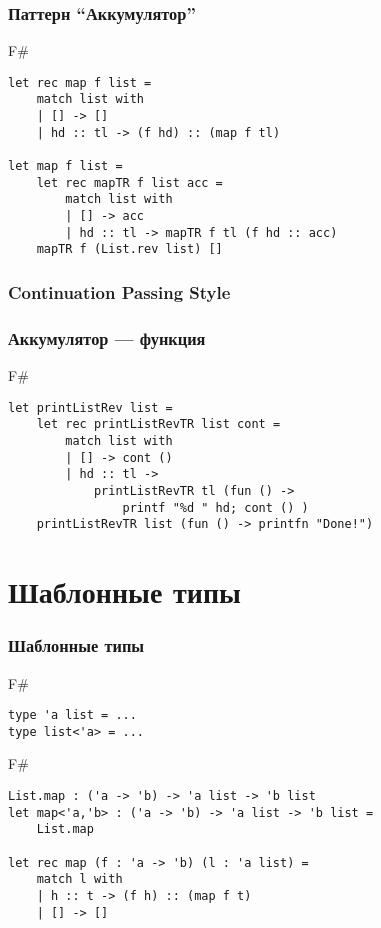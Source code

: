 \documentclass[xetex,mathserif,serif]{beamer}
\begin{document}
\begin{frame}[fragile]
	\frametitle{Паттерн ``Аккумулятор''}
	\begin{exampleblock}{F\#}
		\begin{lstlisting}
let rec map f list =
    match list with
    | [] -> []
    | hd :: tl -> (f hd) :: (map f tl)

let map f list =
    let rec mapTR f list acc =
        match list with
        | [] -> acc
        | hd :: tl -> mapTR f tl (f hd :: acc)
    mapTR f (List.rev list) []
\end{lstlisting}
\end{exampleblock}
	
\end{frame}

\begin{frame}[fragile]
	\frametitle{Continuation Passing Style}
	\frametitle{Аккумулятор --- функция}
	\begin{exampleblock}{F\#}
		\begin{lstlisting}
let printListRev list =
    let rec printListRevTR list cont =
        match list with
        | [] -> cont ()
        | hd :: tl ->
            printListRevTR tl (fun () -> 
                printf "%d " hd; cont () )
    printListRevTR list (fun () -> printfn "Done!")
\end{lstlisting}
\end{exampleblock}
	
\end{frame}

	\section{Шаблонные типы}
	
	\begin{frame}[fragile]
		\frametitle{Шаблонные типы}
		\begin{exampleblock}{F\#}
			\begin{lstlisting}
type 'a list = ...
type list<'a> = ...
\end{lstlisting}
\end{exampleblock}

		\begin{exampleblock}{F\#}
			\begin{lstlisting}
List.map : ('a -> 'b) -> 'a list -> 'b list
let map<'a,'b> : ('a -> 'b) -> 'a list -> 'b list = 
    List.map

let rec map (f : 'a -> 'b) (l : 'a list) =
    match l with
    | h :: t -> (f h) :: (map f t)
    | [] -> []
\end{lstlisting}
\end{exampleblock}
\end{frame}
\end{document}
